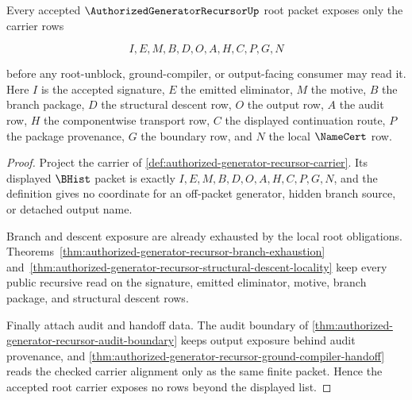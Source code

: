 \begin{theorem}
\label{thm:authorized-generator-recursor-root-carrier-admission}
Every accepted $\AuthorizedGeneratorRecursorUp$ root packet exposes only the carrier rows

$$
I,E,M,B,D,O,A,H,C,P,G,N
$$

before any root-unblock, ground-compiler, or output-facing consumer may read it. Here $I$ is the accepted signature, $E$ the emitted eliminator, $M$ the motive, $B$ the branch package, $D$ the structural descent row, $O$ the output row, $A$ the audit row, $H$ the componentwise transport row, $C$ the displayed continuation route, $P$ the package provenance, $G$ the boundary row, and $N$ the local $\NameCert$ row.
\end{theorem}
\begin{proof}
Project the carrier of \autoref{def:authorized-generator-recursor-carrier}. Its displayed $\BHist$ packet is exactly $I,E,M,B,D,O,A,H,C,P,G,N$, and the definition gives no coordinate for an off-packet generator, hidden branch source, or detached output name.

Branch and descent exposure are already exhausted by the local root obligations. Theorems~\ref{thm:authorized-generator-recursor-branch-exhaustion} and~\ref{thm:authorized-generator-recursor-structural-descent-locality} keep every public recursive read on the signature, emitted eliminator, motive, branch package, and structural descent rows.

Finally attach audit and handoff data. The audit boundary of \autoref{thm:authorized-generator-recursor-audit-boundary} keeps output exposure behind audit provenance, and \autoref{thm:authorized-generator-recursor-ground-compiler-handoff} reads the checked carrier alignment only as the same finite packet. Hence the accepted root carrier exposes no rows beyond the displayed list.
\end{proof}

